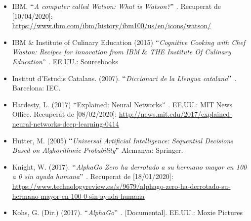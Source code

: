\documentclass[12pt]{article}
\begin{document}
\begin{itemize}
\vspace{\baselineskip}
	\item IBM. $``$\textit{A computer called Watson: What is Watson?}$"$ . Recuperat de [10/04/2020]: \href{https://www.ibm.com/ibm/history/ibm100/us/en/icons/watson/}{https://www.ibm.com/ibm/history/ibm100/us/en/icons/watson/} \par


\vspace{\baselineskip}
	\item IBM $\&$  Institute of Culinary Education (2015) \textit{$``$Cognitive Cooking with Chef Waston: Recipes for innovation from IBM $\&$  THE Institute Of Culinary Education$"$ }. EE.UU.: Sourcebooks\par


\vspace{\baselineskip}
	\item Institut d’Estudis Catalans. (2007). $``$\textit{Diccionari de la Llengua catalana$"$ . }Barcelona: IEC.\par


\vspace{\baselineskip}
	\item Hardesty, L. (2017) $``$Explained: Neural Networks$"$ . EE.UU.: MIT News Office. Recuperat de [08/02/2020]: \href{http://news.mit.edu/2017/explained-neural-networks-deep-learning-0414}{http://news.mit.edu/2017/explained-neural-networks-deep-learning-0414}\par


\vspace{\baselineskip}
	\item Hutter, M. (2005) $``$\textit{Universal Artificial Intelligence: Sequential Decisions Based on Alghorithmic Probability$"$  }Alemanya: Springer.\par


\vspace{\baselineskip}
	\item Knight, W. (2017). $``$\textit{AlphaGo Zero ha derrotado a su hermano mayor en 100 a 0 sin ayuda humana$"$ . } Recuperat de [18/01/2020]: \href{https://www.technologyreview.es/s/9679/alphago-zero-ha-derrotado-su-hermano-mayor-en-100-0-sin-ayuda-humana}{\textcolor[HTML]{0000FF}{\ul{https://www.technologyreview.es/s/9679/alphago-zero-ha-derrotado-su-hermano-mayor-en-100-0-sin-ayuda-humana}}}\par


\vspace{\baselineskip}
	\item Kohs, G. (Dir.) (2017). \textit{$``$AlphaGo$"$ . }[Documental].\textit{ }EE.UU.: Moxie Pictures\par



\end{itemize}
\end{document}
